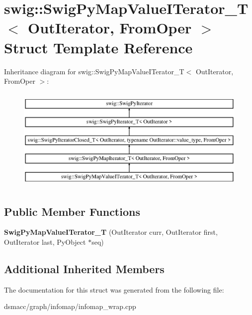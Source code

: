 \hypertarget{structswig_1_1SwigPyMapValueITerator__T}{}\section{swig\+:\+:Swig\+Py\+Map\+Value\+I\+Terator\+\_\+T$<$ Out\+Iterator, From\+Oper $>$ Struct Template Reference}
\label{structswig_1_1SwigPyMapValueITerator__T}
Inheritance diagram for swig\+:\+:Swig\+Py\+Map\+Value\+I\+Terator\+\_\+T$<$ Out\+Iterator, From\+Oper $>$\+:\begin{figure}[H]
\begin{center}
\leavevmode
\includegraphics[height=5.000000cm]{structswig_1_1SwigPyMapValueITerator__T}
\end{center}
\end{figure}
\subsection*{Public Member Functions}
\begin{DoxyCompactItemize}
\item 
\mbox{\label{structswig_1_1SwigPyMapValueITerator__T_ac052c444538753f8a9e977240f6bb93e}} 
{\bfseries Swig\+Py\+Map\+Value\+I\+Terator\+\_\+T} (Out\+Iterator curr, Out\+Iterator first, Out\+Iterator last, Py\+Object $\ast$seq)
\end{DoxyCompactItemize}
\subsection*{Additional Inherited Members}


The documentation for this struct was generated from the following file\+:\begin{DoxyCompactItemize}
\item 
dsmacc/graph/infomap/infomap\+\_\+wrap.\+cpp\end{DoxyCompactItemize}
